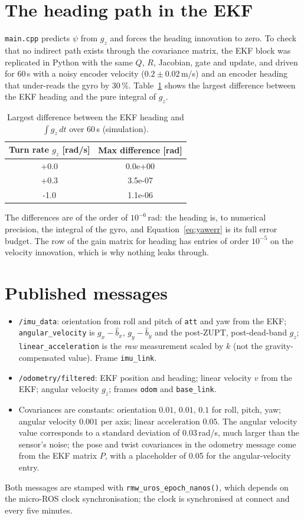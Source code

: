 \documentclass[11pt,a4paper]{report}
\newcommand{\code}[1]{\texttt{#1}}
\begin{document}
\section{The heading path in the EKF}\label{sec:ekfhead}
\code{main.cpp} predicts $\psi$ from $g_z$ and forces the heading innovation to zero. To check that no indirect path exists through the covariance matrix, the EKF block was replicated in Python with the same $Q$, $R$, Jacobian, gate and update, and driven for 60\,s with a noisy encoder velocity ($0.2\pm0.02$\,m/s) and an encoder heading that under-reads the gyro by 30\,\%. Table~\ref{tab:ekf} shows the largest difference between the EKF heading and the pure integral of $g_z$.

\begin{table}[H]
\centering
\caption{Largest difference between the EKF heading and $\int g_z\,dt$ over 60\,s (simulation).}\label{tab:ekf}
\small
\begin{tabular}{@{}cc@{}}
\toprule
Turn rate $g_z$ [rad/s] & Max difference [rad]\\
\midrule
+0.0 & 0.0e+00 \\
+0.3 & 3.5e-07 \\
-1.0 & 1.1e-06 \\
\bottomrule
\end{tabular}
\end{table}
The differences are of the order of $10^{-6}$\,rad: the heading is, to numerical precision, the integral of the gyro, and Equation~\eqref{eq:yawerr} is its full error budget. The row of the gain matrix for heading has entries of order $10^{-5}$ on the velocity innovation, which is why nothing leaks through.

\section{Published messages}
\begin{itemize}[noitemsep]
  \item \code{/imu\_data}: orientation from roll and pitch of \code{att} and yaw from the EKF; \code{angular\_velocity} is $g_x-\hat b_x$, $g_y-\hat b_y$ and the post-ZUPT, post-dead-band $g_z$; \code{linear\_acceleration} is the \emph{raw} measurement scaled by $k$ (not the gravity-compensated value). Frame \code{imu\_link}.
  \item \code{/odometry/filtered}: EKF position and heading; linear velocity $v$ from the EKF; angular velocity $g_z$; frames \code{odom} and \code{base\_link}.
  \item Covariances are constants: orientation $0.01$, $0.01$, $0.1$ for roll, pitch, yaw; angular velocity $0.001$ per axis; linear acceleration $0.05$. The angular velocity value corresponds to a standard deviation of 0.03\,rad/s, much larger than the sensor's noise; the pose and twist covariances in the odometry message come from the EKF matrix $P$, with a placeholder of 0.05 for the angular-velocity entry.
\end{itemize}
Both messages are stamped with \code{rmw\_uros\_epoch\_nanos()}, which depends on the micro-ROS clock synchronisation; the clock is synchronised at connect and every five minutes.
\end{document}
